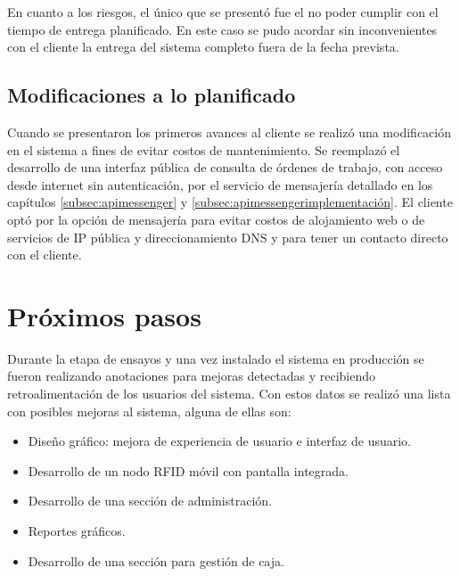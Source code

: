 En cuanto a los riesgos, el único que se presentó fue el no poder cumplir con el tiempo de entrega planificado. En este caso se pudo acordar sin inconvenientes con el cliente la entrega del sistema completo fuera de la fecha prevista. 

\subsection{Modificaciones a lo planificado}
Cuando se presentaron los primeros avances al cliente se realizó una modificación en el sistema a fines de evitar costos de mantenimiento. Se reemplazó el desarrollo de una interfaz pública de consulta de órdenes de trabajo, con acceso desde internet sin autenticación, por el servicio de mensajería detallado en los capítulos \ref{subsec:apimessenger} y \ref{subsec:apimessengerimplementación}. El cliente optó por la opción de mensajería para evitar costos de alojamiento web o de servicios de IP pública y direccionamiento DNS \cite{dns} y para tener un contacto directo con el cliente. 



\section{Próximos pasos}

Durante la etapa de ensayos y una vez instalado el sistema en producción se fueron realizando anotaciones para mejoras detectadas y recibiendo retroalimentación de los usuarios del sistema. Con estos datos se realizó una lista con posibles mejoras al sistema, alguna de ellas son:

\begin{itemize}
\item Diseño gráfico: mejora de experiencia de usuario e interfaz de usuario.
\item Desarrollo de un nodo RFID móvil con pantalla integrada.
\item Desarrollo de una sección de administración.
\item Reportes gráficos.
\item Desarrollo de una sección para gestión de caja.
\end{itemize}
